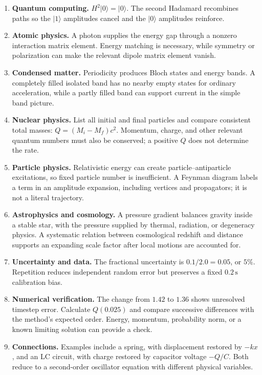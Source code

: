 \documentclass[11pt,oneside]{book}
\newcommand{\ket}[1]{\lvert #1\rangle}
\theoremstyle{reviewstyle}
\begin{document}
\begin{enumerate}
\item \textbf{Quantum computing.} $H^2\ket0=\ket0$. The second Hadamard recombines paths so the $\ket1$ amplitudes cancel and the $\ket0$ amplitudes reinforce.
\item \textbf{Atomic physics.} A photon supplies the energy gap through a nonzero interaction matrix element. Energy matching is necessary, while symmetry or polarization can make the relevant dipole matrix element vanish.
\item \textbf{Condensed matter.} Periodicity produces Bloch states and energy bands. A completely filled isolated band has no nearby empty states for ordinary acceleration, while a partly filled band can support current in the simple band picture.
\item \textbf{Nuclear physics.} List all initial and final particles and compare consistent total masses: $Q=(M_i-M_f)c^2$. Momentum, charge, and other relevant quantum numbers must also be conserved; a positive $Q$ does not determine the rate.
\item \textbf{Particle physics.} Relativistic energy can create particle--antiparticle excitations, so fixed particle number is insufficient. A Feynman diagram labels a term in an amplitude expansion, including vertices and propagators; it is not a literal trajectory.
\item \textbf{Astrophysics and cosmology.} A pressure gradient balances gravity inside a stable star, with the pressure supplied by thermal, radiation, or degeneracy physics. A systematic relation between cosmological redshift and distance supports an expanding scale factor after local motions are accounted for.
\item \textbf{Uncertainty and data.} The fractional uncertainty is $0.1/2.0=0.05$, or $5\%$. Repetition reduces independent random error but preserves a fixed $0.2\,\mathrm s$ calibration bias.
\item \textbf{Numerical verification.} The change from $1.42$ to $1.36$ shows unresolved timestep error. Calculate $Q(0.025)$ and compare successive differences with the method's expected order. Energy, momentum, probability norm, or a known limiting solution can provide a check.
\item \textbf{Connections.} Examples include a spring, with displacement restored by $-kx$, and an LC circuit, with charge restored by capacitor voltage $-Q/C$. Both reduce to a second-order oscillator equation with different physical variables.
\end{enumerate}
\end{document}
